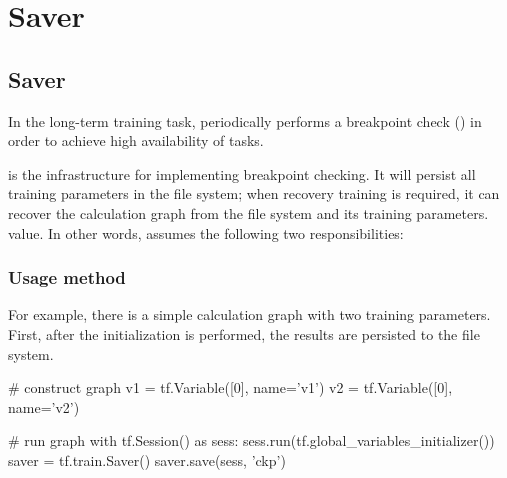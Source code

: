 \begin{savequote}[45mm]
\end{savequote}


\chapter{Saver} 
\label{ch:saver}


\section{Saver}
\begin{content}
In the long-term training task, \tf{} periodically performs a breakpoint check () in order to achieve high availability of tasks.

 is the infrastructure for implementing breakpoint checking. It will persist all training parameters in the file system; when recovery training is required, it can recover the calculation graph from the file system and its training parameters. value. In other words,  assumes the following two responsibilities:

\begin{enum}
\end{enum}


\subsection{Usage method}
For example, there is a simple calculation graph with two training parameters. First, after the initialization is performed, the results are persisted to the file system.

\begin{leftbar}
\begin{python}
# construct graph
v1 = tf.Variable([0], name='v1')
v2 = tf.Variable([0], name='v2')

# run graph
with tf.Session() as sess:
  sess.run(tf.global_variables_initializer())
  saver = tf.train.Saver()
  saver.save(sess, 'ckp')
\end{python}
\end{leftbar}


\end{content}
